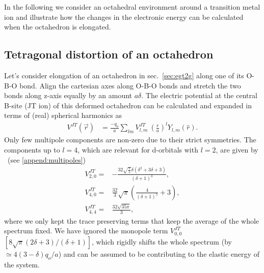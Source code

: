 \documentclass[a4paper,prb]{revtex4-1}  %
\newcommand{\com}[1]{}
\newcommand{\ylm}[1]{Y_{#1}(\hat r)}
\begin{document}
\com{
Instability:\\
 Low/high spin configurations, rules/arguments using single particle spectrum and a given low/high spin state with a given number of electrons:\\
elastic energy vs electronic... number of electrons... multi-electron configurations.... degenerate vs non-degenerate cases...
}






In the following we 
consider an octahedral environment around a transition metal ion 
and 
illustrate how the changes in the electronic energy 
can be calculated
 when the octahedron is elongated.











\subsection{Tetragonal distortion of an octahedron}

Let's consider elongation of an octahedron in sec.~\ref{sec:egt2g} 
along one of its O-B-O bond. 
Align the cartesian axes along O-B-O bonds and stretch the two bonds along z-axis equally by an amount $a\delta$.
The electric potential at the central B-site (JT ion) of this deformed octahedron can be calculated 
and expanded in terms of (real) spherical harmonics as
\begin{align}
V^{JT}(\vec r) &= \frac{-q_o}{a}\sum_{lm}V_{l,m}^{JT}~\left(\frac{r}{a}\right)^l \ylm{l,m}.
\end{align}
Only few multipole components are non-zero due to their strict symmetries.
The components %
up to $l=4$, which are relevant for d-orbitals with $l=2$, are given by
~(see \ref{append:multipoles})
\begin{align}
V_{2,0}^{JT}=& -\frac{32 \sqrt{\frac{\pi }{5}} \delta  \left(\delta ^2+3 \delta +3\right)}{(\delta +1)^3},\\
V_{4,0}^{JT}=& \frac{32}{3} \sqrt{\pi } \left(\frac{4}{(\delta +1)^5}+3\right),\\
V_{4,4}^{JT}=& \frac{32 \sqrt{35 \pi }}{3},
\end{align}
where we only kept
the trace preserving terms that keep the average of the whole spectrum fixed.
We have ignored
the monopole term $V_{0,0}^{JT}$ $[8 \sqrt{\pi } (2 \delta +3)/(\delta +1)]$,
which rigidly shifts the whole spectrum 
(by $\simeq 4 (3-\delta )q_o/a$)
and
can be assumed to be contributing to the elastic energy of the system.
\end{document}
